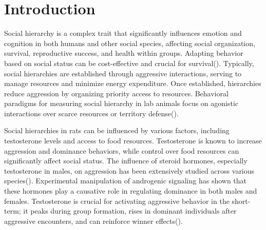 \documentclass[english, a4paper, 11pt]{article}
\begin{document}
\newpage

\onehalfspacing




\maketitle




\section{Introduction}
Social hierarchy is a complex trait that significantly influences emotion and cognition in both humans and other social species, affecting social organization, survival, reproductive success, and health within groups. Adapting behavior based on social status can be cost-effective and crucial for survival(\cite{vesseyDominanceControl1981}). Typically, social hierarchies are established through aggressive interactions, serving to manage resources and minimize energy expenditure. Once established, hierarchies reduce aggression by organizing priority access to resources. Behavioral paradigms for measuring social hierarchy in lab animals focus on agonistic interactions over scarce resources or territory defense(\cite{zhouAdvancesUnderstandingNeural2018}).

Social hierarchies in rats can be influenced by various factors, including testosterone levels and access to food resources. Testosterone is known to increase aggression and dominance behaviors, while control over food resources can significantly affect social status. The influence of steroid hormones, especially testosterone in males, on aggression has been extensively studied across various species(\cite{hamiltonSocialNeuroendocrinologyStatus2015}). Experimental manipulation of androgenic signaling has shown that these hormones play a causative role in regulating dominance in both males and females. Testosterone is crucial for activating aggressive behavior in the short-term; it peaks during group formation, rises in dominant individuals after aggressive encounters, and can reinforce winner effects(\cite{fuxjagerSpeciesDifferencesWinner2011,oliveiraWhyWinnersKeep2009}).
\end{document}
